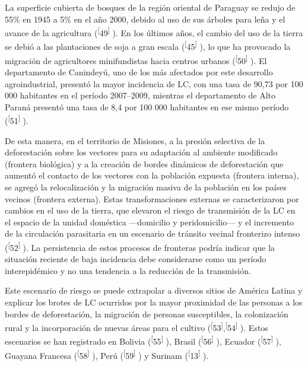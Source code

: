 \documentclass{article}
\begin{document}
La superficie cubierta de bosques de la región oriental de Paraguay se redujo de
55\% en 1945 a 5\% en el año 2000, debido al uso de sus árboles para leña y el
avance de la agricultura (\textsuperscript{[}49\textsuperscript{]}
). En los últimos años, el cambio del uso de la tierra se debió a las
plantaciones de soja a gran escala (\textsuperscript{[}45\textsuperscript{]}
), lo que ha provocado la migración de agricultores minifundistas hacia centros
urbanos (\textsuperscript{[}50\textsuperscript{]}
). El departamento de Canindeyú, uno de los más afectados por este desarrollo
agroindustrial, presentó la mayor incidencia de LC, con una tasa de 90,73 por
100 000 habitantes en el período 2007–2009, mientras el departamento de Alto
Paraná presentó una tasa de 8,4 por 100 000 habitantes en ese mismo período
(\textsuperscript{[}51\textsuperscript{]}
).

De esta manera, en el territorio de Misiones, a la presión selectiva de la
deforestación sobre los vectores para su adaptación al ambiente modificado
(frontera biológica) y a la creación de bordes dinámicos de deforestación que
aumentó el contacto de los vectores con la población expuesta (frontera
interna), se agregó la relocalización y la migración masiva de la población en
los países vecinos (frontera externa). Estas transformaciones externas se
caracterizaron por cambios en el uso de la tierra, que elevaron el riesgo de
transmisión de la LC en el espacio de la unidad doméstica —domicilio y
peridomicilio— y el incremento de la circulación parasitaria en un escenario de
tránsito vecinal fronterizo intenso (\textsuperscript{[}52\textsuperscript{]}
). La persistencia de estos procesos de fronteras podría indicar que la
situación reciente de baja incidencia debe considerarse como un período
interepidémico y no una tendencia a la reducción de la transmisión.

Este escenario de riesgo se puede extrapolar a diversos sitios de América Latina
y explicar los brotes de LC ocurridos por la mayor proximidad de las personas a
los bordes de deforestación, la migración de personas susceptibles, la
colonización rural y la incorporación de nuevas áreas para el cultivo
(\textsuperscript{[}53\textsuperscript{]},\textsuperscript{[}54\textsuperscript{]}
). Estos escenarios se han registrado en Bolivia
(\textsuperscript{[}55\textsuperscript{]}
), Brasil (\textsuperscript{[}56\textsuperscript{]}
), Ecuador (\textsuperscript{[}57\textsuperscript{]}
), Guayana Francesa (\textsuperscript{[}58\textsuperscript{]}
), Perú (\textsuperscript{[}59\textsuperscript{]}
) y Surinam (\textsuperscript{[}13\textsuperscript{]}
).
\end{document}
